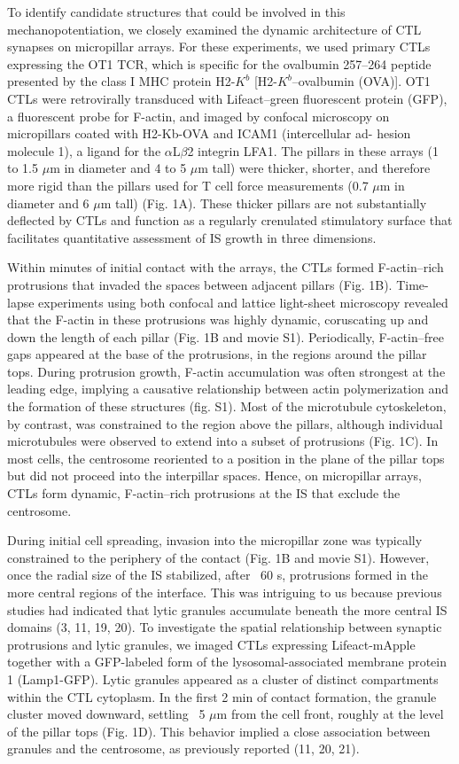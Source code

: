 To identify candidate structures that could be involved in this mechanopotentiation, we closely examined the dynamic architecture of CTL synapses on micropillar arrays. For these experiments, we used primary CTLs expressing the OT1 TCR, which is specific for the ovalbumin 257–264 peptide presented by the class I MHC protein H2-$K^{b}$ [H2-$K^{b}$–ovalbumin (OVA)]. OT1 CTLs were retrovirally transduced with Lifeact–green fluorescent protein (GFP), a fluorescent probe for F-actin, and imaged by confocal microscopy on micropillars coated with H2-Kb-OVA and ICAM1 (intercellular ad- hesion molecule 1), a ligand for the $\alpha$L$\beta$2 integrin LFA1. The pillars in these arrays (1 to 1.5 $\mu$m in diameter and 4 to 5 $\mu$m tall) were thicker, shorter, and therefore more rigid than the pillars used for T cell force measurements (0.7 $\mu$m in diameter and 6 $\mu$m tall) (Fig. 1A). These thicker pillars are not substantially deflected by CTLs and function as a regularly crenulated stimulatory surface that facilitates quantitative assessment of IS growth in three dimensions.

Within minutes of initial contact with the arrays, the CTLs formed F-actin–rich protrusions that invaded the spaces between adjacent pillars (Fig. 1B). Time-lapse experiments using both confocal and lattice light-sheet microscopy revealed that the F-actin in these protrusions was highly dynamic, coruscating up and down the length of each pillar (Fig. 1B and movie S1). Periodically, F-actin–free gaps appeared at the base of the protrusions, in the regions around the pillar tops. During protrusion growth, F-actin accumulation was often strongest at the leading edge, implying a causative relationship between actin polymerization and the formation of these structures (fig. S1). Most of the microtubule cytoskeleton, by contrast, was constrained to the region above the pillars, although individual microtubules were observed to extend into a subset of protrusions (Fig. 1C). In most cells, the centrosome reoriented to a position in the plane of the pillar tops but did not proceed into the interpillar spaces. Hence, on micropillar arrays, CTLs form dynamic, F-actin–rich protrusions at the IS that exclude the centrosome.

During initial cell spreading, invasion into the micropillar zone was typically constrained to the periphery of the contact (Fig. 1B and movie S1). However, once the radial size of the IS stabilized, after ~60 s, protrusions formed in the more central regions of the interface. This was intriguing to us because previous studies had indicated that lytic granules accumulate beneath the more central IS domains (3, 11, 19, 20). To investigate the spatial relationship between synaptic protrusions and lytic granules, we imaged CTLs expressing Lifeact-mApple together with a GFP-labeled form of the lysosomal-associated membrane protein 1 (Lamp1-GFP). Lytic granules appeared as a cluster of distinct compartments within the CTL cytoplasm. In the first 2 min of contact formation, the granule cluster moved downward, settling ~5 $\mu$m from the cell front, roughly at the level of the pillar tops (Fig. 1D). This behavior implied a close association between granules and the centrosome, as previously reported (11, 20, 21).

